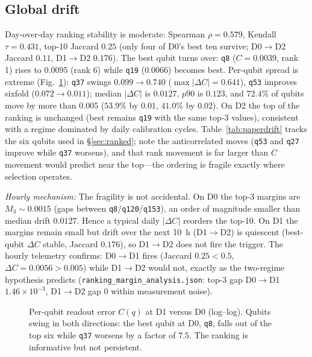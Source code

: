 \documentclass[journal,10pt,twocolumn]{IEEEtran}
\newcommand{\q}[1]{\texttt{q#1}}
\begin{document}
\subsection{Global drift}
\label{sec:driftglob}
Day-over-day ranking stability is moderate: Spearman $\rho{=}0.579$, Kendall $\tau{=}0.431$, top-10 Jaccard $0.25$
(only four of D0's best ten survive; D0$\to$D2 Jaccard $0.11$, D1$\to$D2 $0.176$). The best qubit turns over:
\q{8} ($C{=}0.0039$, rank 1) rises to $0.0095$ (rank 6) while \q{19} ($0.0066$) becomes best. Per-qubit spread is
extreme (Fig.~\ref{fig:driftq}): \q{37} swings $0.099{\to}0.740$ ($\max|\Delta C|{=}0.641$), \q{53} improves sixfold
($0.072{\to}0.011$); median $|\Delta C|$ is $0.0127$, $p90$ is $0.123$, and $72.4\%$ of qubits move by more than
$0.005$ ($53.9\%$ by $0.01$, $41.0\%$ by $0.02$). On D2 the top of the ranking is unchanged (best remains \q{19}
with the same top-3 values), consistent with a regime dominated by daily calibration cycles. Table~\ref{tab:paperdrift}
tracks the six qubits used in \S\ref{sec:ranked}; note the anticorrelated moves (\q{53} and \q{27} improve while
\q{37} worsens), and that rank movement is far larger than $C$ movement would predict near the top---the ordering
is fragile exactly where selection operates.

\emph{Hourly mechanism:} The fragility is not accidental. On D0 the top-3 margins are $M_3\sim0.0015$ (gaps
between \q{8}/\q{120}/\q{153}), an order of magnitude smaller than median drift $0.0127$. Hence a typical daily
$|\Delta C|$ reorders the top-10. On D1 the margins remain small but drift over the next 10~h (D1$\to$D2) is
quiescent (best-qubit $\Delta C$ stable, Jaccard $0.176$), so D1$\to$D2 does not fire the trigger. The hourly
telemetry confirms: D0$\to$D1 fires (Jaccard $0.25<0.5$, $\Delta C{=}0.0056>0.005$) while D1$\to$D2 would not,
exactly as the two-regime hypothesis predicts (\texttt{ranking\_margin\_analysis.json}: top-3 gap D0$\to$D1
$1.46\times10^{-3}$, D1$\to$D2 gap $0$ within measurement noise).

\begin{figure}[t]
\centering
{}%
\caption{Per-qubit readout error $C(q)$ at D1 versus D0 (log--log). Qubits swing in both directions: the best qubit
at D0, \q{8}, falls out of the top six while \q{37} worsens by a factor of $7.5$. The ranking is informative but
not persistent.}
\label{fig:driftq}
\end{figure}
\end{document}
